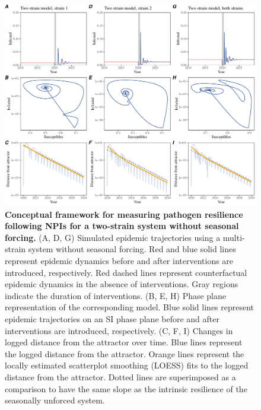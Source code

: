 \documentclass[12pt]{article}
\begin{document}
\pagebreak

\begin{figure}[!th]
\includegraphics[width=\textwidth]{../figure2/figure2_multi_noseas.pdf}
\caption{
\textbf{Conceptual framework for measuring pathogen resilience following NPIs for a two-strain system without seasonal forcing.}
(A, D, G) Simulated epidemic trajectories using a multi-strain system without seasonal forcing.
Red and blue solid lines represent epidemic dynamics before and after interventions are introduced, respectively.
Red dashed lines represent counterfactual epidemic dynamics in the absence of interventions.
Gray regions indicate the duration of interventions.
(B, E, H) Phase plane representation of the corresponding model.
Blue solid lines represent epidemic trajectories on an SI phase plane before and after interventions are introduced, respectively.
(C, F, I) Changes in logged distance from the attractor over time.
Blue lines represent the logged distance from the attractor.
Orange lines represent the locally estimated scatterplot smoothing (LOESS) fits to the logged distance from the attractor.
Dotted lines are superimposed as a comparison to have the same slope as the intrinsic resilience of the seasonally unforced system.
}
\end{figure}

\pagebreak
\end{document}
